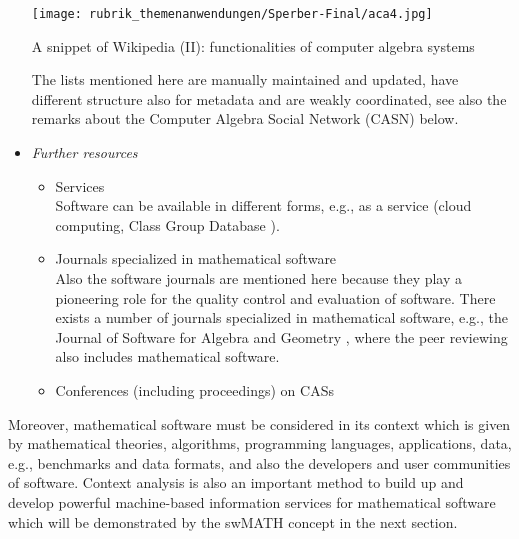 \documentclass[a4paper,11pt]{article}
\begin{document}
\begin{multicols}{2}
\begin{itemize}
\begin{figurehere}
  \centering
  \texttt{[image: rubrik\_themenanwendungen/Sperber-Final/aca4.jpg]}
  \caption{A snippet of Wikipedia (II): functionalities of computer algebra systems \label{abb_4}}
\end{figurehere}

The lists mentioned here are manually maintained and updated, have different structure also for metadata and are weakly coordinated, see also the remarks about the Computer Algebra Social Network (CASN) below.
\item{\textit{Further resources}}\\
\begin{itemize}
\item{Services}\\
Software can be available in different forms, e.g., as a service (cloud computing, Class Group Database \cite{CCDb,MKD}).
\item{Journals specialized in mathematical software}\\
  Also the software journals are mentioned here because they play a pioneering role for the quality control and evaluation of software. There exists a number of journals specialized in mathematical software, e.g., the Journal of Software for Algebra and Geometry \cite{JAG}, where the peer reviewing also includes mathematical software.
\item{Conferences (including proceedings) on CASs}
\end{itemize}
\end{itemize}
Moreover, mathematical software must be considered in its context which is given by mathematical theories, algorithms, programming languages, applications, data, e.g., benchmarks and data formats, and also the developers and user communities of software. Context analysis is also an important method to build up and develop powerful machine-based information services for mathematical software which will be demonstrated by the swMATH concept in the next section.


\end{multicols}
\end{document}
